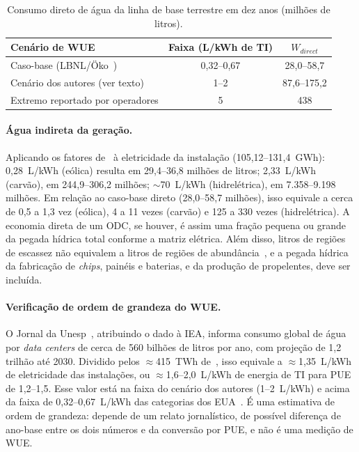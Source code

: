 \documentclass[11pt,a4paper]{article}
\begin{document}
\begin{table}[ht]
\centering
\caption{Consumo direto de água da linha de base terrestre em dez anos
(milhões de litros).}
\label{tab:agua}
\small
\begin{tabular}{@{}lcc@{}}
\toprule
Cenário de WUE & Faixa (L/kWh de TI) & $W_{direct}$\\
\midrule
Caso-base (LBNL/Öko~\cite{r8})     & 0,32--0,67 & 28,0--58,7\\
Cenário dos autores (ver texto)    & 1--2       & 87,6--175,2\\
Extremo reportado por operadores   & 5          & 438\\
\bottomrule
\end{tabular}
\end{table}

\paragraph{Água indireta da geração.} Aplicando os fatores de~\cite{r8} à
eletricidade da instalação (105,12--131,4~GWh): 0,28~L/kWh (eólica) resulta em
29,4--36,8 milhões de litros; 2,33~L/kWh (carvão), em 244,9--306,2 milhões;
$\sim$70~L/kWh (hidrelétrica), em 7.358--9.198 milhões. Em relação ao caso-base
direto (28,0--58,7 milhões), isso equivale a cerca de 0,5 a 1,3 vez (eólica), 4
a 11 vezes (carvão) e 125 a 330 vezes (hidrelétrica). A economia direta de um
ODC, se houver, é assim uma fração pequena ou grande da pegada hídrica total
conforme a matriz elétrica. Além disso, litros de regiões de escassez não
equivalem a litros de regiões de abundância~\cite{r39}, e a pegada hídrica da
fabricação de \emph{chips}, painéis e baterias, e da produção de propelentes,
deve ser incluída.

\paragraph{Verificação de ordem de grandeza do WUE.} O Jornal da
Unesp~\cite{r22}, atribuindo o dado à IEA, informa consumo global de água por
\emph{data centers} de cerca de 560 bilhões de litros por ano, com projeção de
1,2 trilhão até 2030. Dividido pelos $\approx$415~TWh de~\cite{r5}, isso
equivale a $\approx$1,35~L/kWh de eletricidade das instalações, ou
$\approx$1,6--2,0~L/kWh de energia de TI para PUE de 1,2--1,5. Esse valor está
na faixa do cenário dos autores (1--2~L/kWh) e acima da faixa de
0,32--0,67~L/kWh das categorias dos EUA~\cite{r8}. É uma estimativa de ordem de
grandeza: depende de um relato jornalístico, de possível diferença de ano-base
entre os dois números e da conversão por PUE, e não é uma medição de WUE.
\end{document}

